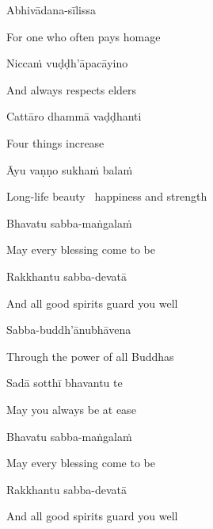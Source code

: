 \suttaRef{[Dhs A]}

Abhivādana-sīlissa

\begin{english}
  For one who often pays homage
\end{english}

Niccaṁ vuḍḍh'āpacāyino

\begin{english}
  And always respects elders
\end{english}

Cattāro dhammā vaḍḍhanti

\begin{english}
  Four things increase
\end{english}

Āyu vaṇṇo sukhaṁ balaṁ

\begin{english}
  Long-life beauty \breathmark\ happiness and strength
\end{english}

\suttaRef{[Dhp 109]}

Bhavatu sabba-maṅgalaṁ

\begin{english}
  May every blessing come to be
\end{english}

Rakkhantu sabba-devatā

\begin{english}
  And all good spirits guard you well
\end{english}

Sabba-buddh'ānubhāvena

\begin{english}
  Through the power of all Buddhas
\end{english}

Sadā sotthī bhavantu te

\begin{english}
  May you always be at ease
\end{english}

Bhavatu sabba-maṅgalaṁ

\begin{english}
  May every blessing come to be
\end{english}

Rakkhantu sabba-devatā

\begin{english}
  And all good spirits guard you well
\end{english}


